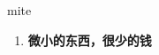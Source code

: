 
\begin{frame}
{\huge mite}
\begin{center}
\begin{enumerate}\Large
  \item \textbf{微小的东西，很少的钱}
\end{enumerate}
\end{center}
\end{frame}
